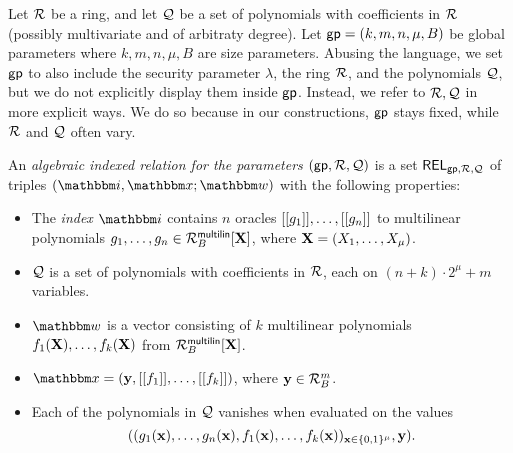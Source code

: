 \documentclass[11pt,letterpaper,usenames,dvipsnames]{article}
\begin{document}
    \begin{definition}
    \label{d: Algebraic  Indexed Relation over a ring}
    Let $\mathcal{R}$ be a ring, and let $\mathcal{Q}$ be a set of polynomials with coefficients in $\mathcal{R}$ (possibly multivariate and of arbitraty degree). Let $\mathsf{gp}=(k,m,n,\mu, B)$ be  global parameters where $k,m,n,\mu,B$ are size parameters.  Abusing the language, we set $\mathsf{gp}$ to also include the security parameter $\lambda$, the ring $\mathcal{R}$, and the polynomials $\mathcal{Q}$, but we do not explicitly display them inside $\mathsf{gp}$. Instead, we refer to $\mathcal{R}, \mathcal{Q}$ in more explicit ways. We do so because in our constructions, $\mathsf{gp}$ stays fixed, while $\mathcal{R}$ and $\mathcal{Q}$ often vary.
    
    An \emph{algebraic indexed relation for the parameters $(\mathsf{gp}, \mathcal{R}, \mathcal{Q})$}  is a set $\mathsf{REL}_{\mathsf{gp},\mathcal{R},\mathcal{Q}}$ of triples $(\idx, \inp; \wit)$ with the following properties:
    
        \begin{itemize}
            \item The \emph{index} $\idx$ contains  $n$ oracles $[[{g_1}]],\ldots, [[{g_n}]]$ to multilinear polynomials $g_1,\ldots, g_n\in \mathcal{R}_B^{\mathsf{multilin}}[\mathbf{X}]$, where $\mathbf{X}=(X_1,\ldots, X_\mu)$.
            \item $\mathcal{Q}$ is a set of polynomials with coefficients in $\mathcal{R}$, each on $(n+ k)\cdot 2^\mu + m$ variables.
            \item $\wit$ is a vector consisting of $k$ multilinear polynomials $f_1(\mathbf{X}),\ldots, f_k(\mathbf{X})$ from $\mathcal{R}_B^{\mathsf{multilin}}[\mathbf{X}]$. %
            \item $\inp=(\yy, \oracle{f_1}, \ldots, \oracle{f_k})$, where $\mathbf{y}\in \mathcal{R}_B^m$.
            \item Each of the polynomials in $\mathcal{Q}$ vanishes when evaluated on the values $$((g_1(\mathbf{x}),\ldots, g_n(\mathbf{x}), f_1(\mathbf{x}),\ldots, f_k(\mathbf{x}))_{\mathbf{x}\in \{0,1\}^\mu}, \mathbf{y}).$$ 
        \end{itemize}
    

\end{definition}
\end{document}
